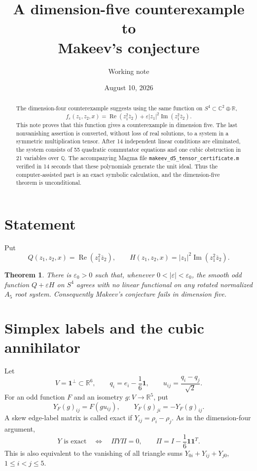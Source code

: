\documentclass[11pt,reqno]{amsart}
\title{A dimension-five counterexample to\\Makeev's conjecture}
\author{Working note}
\date{August 10, 2026}
\newtheorem{theorem}{Theorem}[section]
\theoremstyle{remark}
\newcommand{\R}{\mathbb R}
\newcommand{\C}{\mathbb C}
\newcommand{\one}{\mathbf 1}
\newcommand{\eps}{\varepsilon}
\newcommand{\abs}[1]{\left\lvert #1\right\rvert}
\begin{document}
\begin{abstract}
The dimension-four counterexample suggests using the same function on
$S^4\subset\C^2\oplus\R$,
\[
 f_\eps(z_1,z_2,x)=\operatorname{Re}(z_1^2\overline z_2)
 +\eps\abs{z_1}^2\operatorname{Im}(z_1^2\overline z_2).
\]
This note proves that this function gives a counterexample in dimension five.
The last nonvanishing assertion is converted, without loss of real solutions,
to a system in a symmetric multiplication tensor.  After 14 independent
linear conditions are eliminated, the system consists of 55 quadratic
commutator equations and one cubic obstruction in 21 variables over
$\mathbb Q$.  The accompanying Magma file
\texttt{makeev\_d5\_tensor\_certificate.m} verified in 14 seconds that these
polynomials generate the unit ideal.  Thus the computer-assisted part is an
exact symbolic calculation, and the dimension-five theorem is unconditional.
\end{abstract}

\maketitle

\section{Statement}

Put
\[
 Q(z_1,z_2,x)=\operatorname{Re}(z_1^2\overline z_2),\qquad
 H(z_1,z_2,x)=\abs{z_1}^2\operatorname{Im}(z_1^2\overline z_2).
\]

\begin{theorem}\label{thm:main}
There is $\eps_0>0$ such that, whenever $0<\abs\eps<\eps_0$, the smooth odd function
$Q+\eps H$ on $S^4$ agrees with no linear functional on any rotated normalized
$A_5$ root system.  Consequently Makeev's conjecture fails in dimension five.
\end{theorem}

\section{Simplex labels and the cubic annihilator}

Let
\[
 V=\one^\perp\subset\R^6,\qquad
 q_i=e_i-\frac16\one,\qquad
 u_{ij}=\frac{q_i-q_j}{\sqrt2}.
\]
For an odd function $F$ and an isometry $g:V\to\R^5$, put
\[
 Y_F(g)_{ij}=F(gu_{ij}),\qquad Y_F(g)_{ji}=-Y_F(g)_{ij}.
\]
A skew edge-label matrix is called exact if
$Y_{ij}=\rho_i-\rho_j$.  As in the dimension-four argument,
\begin{equation}\label{eq:exact}
 Y\text{ is exact}\quad\Longleftrightarrow\quad
 \Pi Y\Pi=0,\qquad
 \Pi=I-\frac16\one\one^T.
\end{equation}
This is also equivalent to the vanishing of all triangle sums
$Y_{0i}+Y_{ij}+Y_{j0}$, $1\le i<j\le5$.
\end{document}
